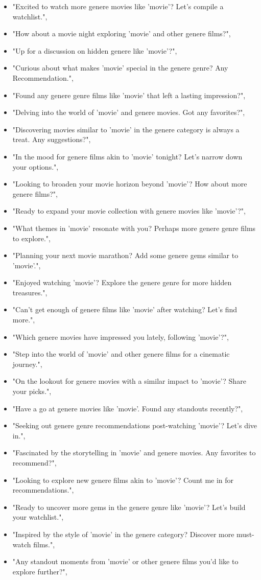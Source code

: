 \begin{LTR}
\begin{itemize}
\item
"Excited to watch more {genere} movies like '{movie}'? Let's compile a watchlist.",
\item
"How about a movie night exploring '{movie}' and other {genere} films?",
\item
"Up for a discussion on hidden {genere} like '{movie}'?",
\item
"Curious about what makes '{movie}' special in the {genere} genre? Any Recommendation.",
\item
"Found any {genere} genre films like '{movie}' that left a lasting impression?",
\item
"Delving into the world of '{movie}' and {genere} movies. Got any favorites?",
\item
"Discovering movies similar to '{movie}' in the {genere} category is always a treat. Any suggestions?",
\item
"In the mood for {genere} films akin to '{movie}' tonight? Let's narrow down your options.",
\item
"Looking to broaden your movie horizon beyond '{movie}'? How about more {genere} films?",
\item
"Ready to expand your movie collection with {genere} movies like '{movie}'?",
\item
"What themes in '{movie}' resonate with you? Perhaps more {genere} genre films to explore.",
\item
"Planning your next movie marathon? Add some {genere} gems similar to '{movie}'.",
\item
"Enjoyed watching '{movie}'? Explore the {genere} genre for more hidden treasures.",
\item
"Can't get enough of {genere} films like '{movie}' after watching? Let's find more.",
\item
"Which {genere} movies have impressed you lately, following '{movie}'?",
\item
"Step into the world of '{movie}' and other {genere} films for a cinematic journey.",
\item
"On the lookout for {genere} movies with a similar impact to '{movie}'? Share your picks.",
\item
"Have a go at {genere} movies like '{movie}'. Found any standouts recently?",
\item
"Seeking out {genere} genre recommendations post-watching '{movie}'? Let's dive in.",
\item
"Fascinated by the storytelling in '{movie}' and {genere} movies. Any favorites to recommend?",
\item
"Looking to explore new {genere} films akin to '{movie}'? Count me in for recommendations.",
\item
"Ready to uncover more gems in the {genere} genre like '{movie}'? Let's build your watchlist.",
\item
"Inspired by the style of '{movie}' in the {genere} category? Discover more must-watch films.",
\item
"Any standout moments from '{movie}' or other {genere} films you'd like to explore further?",
\end{itemize}
\end{LTR}


